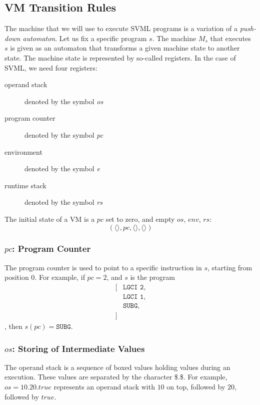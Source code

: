 \begin{appendices}
\subsection{VM Transition Rules}
\label{sec:org7e77008}
The machine that we will use to execute SVML programs is a variation of a \emph{push-down automaton}. Let us fix a specific program \(s\). The machine \(M_s\) that executes \(s\) is given as an automaton that transforms a given machine state to another state. The machine state is represented by so-called registers.
In the case of SVML, we need four registers:
\begin{description}
\item[{operand stack}] denoted by the symbol \textit{os}
\item[{program counter}] denoted by the symbol \textit{pc}
\item[{environment}] denoted by the symbol \textit{e}
\item[{runtime stack}] denoted by the symbol \textit{rs}
\end{description}
The initial state of a VM is a \(\textit{pc}\) set to zero, and empty \(\textit{os}\), \(\textit{env}\), \(\textit{rs}\):
$$(\langle \rangle, \textit{pc}, \langle \rangle, \langle \rangle)$$

\subsubsection{\(\textit{pc}\): Program Counter}
\label{sec:org92c6cf6}
The program counter is used to point to a specific instruction in \(s\), starting from position 0.
For example, if \(\textit{pc} = 2\), and \(s\) is the program
$$\begin{aligned}
\lbrack&\texttt{LGCI 2},\\
&\texttt{LGCI 1},\\
&\texttt{SUBG},\\
\rbrack
\end{aligned}$$
, then \(s(\textit{pc}) = \texttt{SUBG}\).

\subsubsection{\(\textit{os}\): Storing of Intermediate Values}
\label{sec:orgb219984}
The operand stack is a sequence of boxed values holding values during an execution. These values are separated by the character \$.\$.
For example, \(\textit{os} = 10.20.\textit{true}\) represents an operand stack with \(10\) on top, followed by \(20\), followed by \(\textit{true}\).


\end{appendices}
